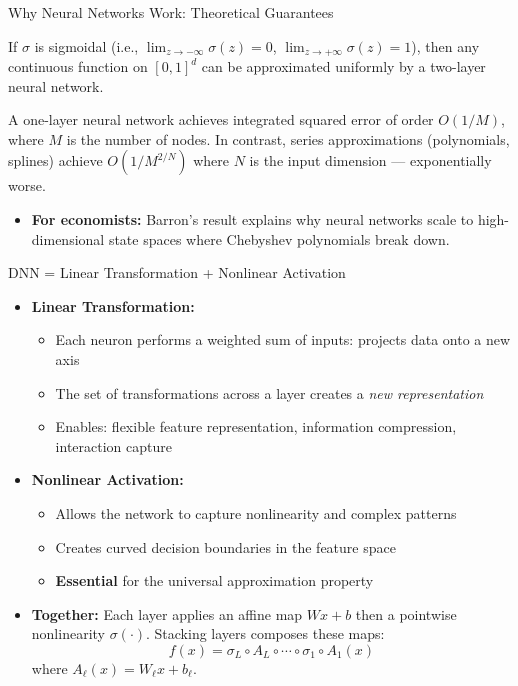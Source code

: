 \documentclass[10pt,english,aspectratio=169]{beamer}
\begin{document}
\begin{frame}{Why Neural Networks Work: Theoretical Guarantees}

\begin{tcolorbox}[colback=blue!3, colframe=blue!40, title={Universal Approximation Theorem (Cybenko, 1989)}]
If $\sigma$ is sigmoidal (i.e., $\lim_{z\to-\infty}\sigma(z)=0$, $\lim_{z\to+\infty}\sigma(z)=1$), then any continuous function on $[0,1]^d$ can be approximated uniformly by a two-layer neural network.
\end{tcolorbox}

\medskip

\begin{tcolorbox}[colback=green!3, colframe=green!40, title={Breaking the Curse of Dimensionality (Barron, 1993)}]
A one-layer neural network achieves integrated squared error of order $O(1/M)$, where $M$ is the number of nodes. In contrast, series approximations (polynomials, splines) achieve $O(1/M^{2/N})$ where $N$ is the input dimension --- exponentially worse.
\end{tcolorbox}

\medskip
\begin{itemize}
\item \textbf{For economists:} Barron's result explains why neural networks scale to high-dimensional state spaces where Chebyshev polynomials break down.
\end{itemize}
\end{frame}

\begin{frame}{DNN = Linear Transformation + Nonlinear Activation}
\begin{itemize}
\item \textbf{Linear Transformation:}
\begin{itemize}
\item Each neuron performs a weighted sum of inputs: projects data onto a new axis
\item The set of transformations across a layer creates a \emph{new representation}
\item Enables: flexible feature representation, information compression, interaction capture
\end{itemize}

\medskip
\item \textbf{Nonlinear Activation:}
\begin{itemize}
\item Allows the network to capture nonlinearity and complex patterns
\item Creates curved decision boundaries in the feature space
\item \textbf{Essential} for the universal approximation property
\end{itemize}

\medskip
\item \textbf{Together:} Each layer applies an affine map $Wx+b$ then a pointwise nonlinearity $\sigma(\cdot)$. Stacking layers composes these maps:
\[
f(x) = \sigma_L \circ A_L \circ \cdots \circ \sigma_1 \circ A_1 (x)
\]
where $A_\ell(x) = W_\ell x + b_\ell$.
\end{itemize}
\end{frame}
\end{document}
